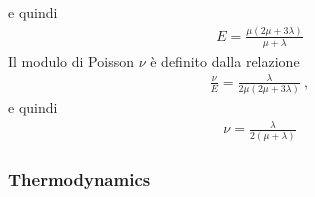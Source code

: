 \documentclass[letterpaper,10pt,english]{jupyterBook}
\begin{document}
\sphinxAtStartPar
e quindi
\begin{equation*}
\begin{split}E = \frac{\mu (2 \mu + 3 \lambda)}{\mu + \lambda}\end{split}
\end{equation*}
\sphinxAtStartPar
{} Il modulo di Poisson \(\nu\) è definito dalla relazione
\begin{equation*}
\begin{split}\frac{\nu}{E} = \frac{\lambda}{2\mu (2 \mu + 3 \lambda)} \ ,\end{split}
\end{equation*}
\sphinxAtStartPar
e quindi
\begin{equation*}
\begin{split}\nu = \frac{\lambda}{2 (\mu + \lambda)}\end{split}
\end{equation*}\subsubsection*{Thermodynamics}
\end{document}
